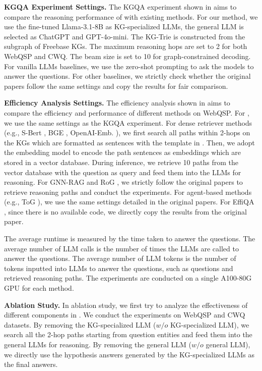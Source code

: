 

\noindent\textbf{KGQA Experiment Settings.} The KGQA experiment shown in  aims to compare the reasoning performance of \ourmethod with existing methods. For our method, we use the fine-tuned Llama-3.1-8B as KG-specialized LLMs, the general LLM is selected as ChatGPT and GPT-4o-mini. The KG-Trie is constructed from the subgraph of Freebase KGs. The maximum reasoning hops are set to 2 for both WebQSP and CWQ. The beam size is set to 10 for graph-constrained decoding. For vanilla LLMs baselines, we use the zero-shot prompting to ask the models to answer the questions. For other baselines, we strictly check whether the original papers follow the same settings and copy the results for fair comparison.

\noindent\textbf{Efficiency Analysis Settings.} The efficiency analysis shown in  aims to compare the efficiency and performance of different methods on WebQSP. For \ourmethod, we use the same settings as the KGQA experiment. For dense retriever methods (e.g., S-Bert \citep{reimers-2019-sentence-bert}, BGE \citep{llm_embedder}, OpenAI-Emb. \citep{openai-embedding}), we first search all paths within 2-hops on the KGs which are formatted as sentences with the template in . Then, we adopt the embedding model to encode the path sentences as embeddings which are stored in a vector database. During inference, we retrieve 10 paths from the vector database with the question as query and feed them into the LLMs for reasoning. For GNN-RAG \citep{mavromatis2024gnn} and RoG \citep{luo2024rog}, we strictly follow the original papers to retrieve reasoning paths and conduct the experiments. For agent-based methods (e.g., ToG \citep{sunthink}), we use the same settings detailed in the original papers. For EffiQA \citep{jiang2024kg}, since there is no available code, we directly copy the results from the original paper.

The average runtime is measured by the time taken to answer the questions. The average number of LLM calls is the number of times the LLMs are called to answer the questions. The average number of LLM tokens is the number of tokens inputted into LLMs to answer the questions, such as questions and retrieved reasoning paths. The experiments are conducted on a single A100-80G GPU for each method.

\noindent\textbf{Ablation Study.} In ablation study, we first try to analyze the effectiveness of different components in \ourmethod. We conduct the experiments on WebQSP and CWQ datasets. By removing the KG-specialized LLM ($w/o$ KG-specialized LLM), we search all the 2-hop paths starting from question entities and feed them into the general LLMs for reasoning. By removing the general LLM ($w/o$ general LLM), we directly use the hypothesis answers generated by the KG-specialized LLMs as the final answers.


